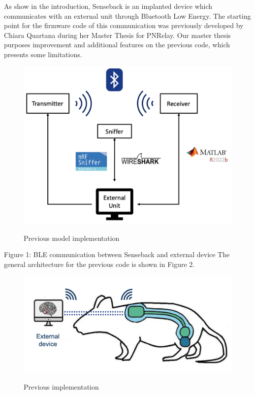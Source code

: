 \documentclass{Configuration_Files/PoliMi3i_thesis}
\begin{document}
As show in the introduction, Senseback is an implanted device which communicates with an external unit through Bluetooth Low Energy. The starting point for the firmware code of this communication was previously developed by Chiara Quartana during her Master Thesis for PNRelay. Our master thesis purposes improvement and additional features on the previous code, which presents some limitations.

\begin{figure}[H]
	\includegraphics[scale=0.3]{prev1.png}
	\centering
    \label{prev_1}
    \caption{Previous model implementation}
\end{figure}

Figure 1: BLE communication between Senseback and external device
The general architecture for the previous code is shown in Figure 2.

\begin{figure}[H]
	\includegraphics[scale=0.3]{prev2.png}
	\centering
    \label{prev_2}
    \caption{Previous implementation}
\end{figure}
\end{document}
